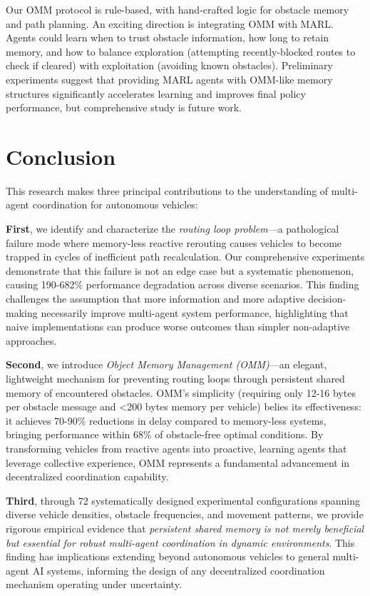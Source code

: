 \documentclass[conference]{IEEEtran}
\begin{document}
Our OMM protocol is rule-based, with hand-crafted logic for obstacle memory and path planning. An exciting direction is integrating OMM with MARL. Agents could learn when to trust obstacle information, how long to retain memory, and how to balance exploration (attempting recently-blocked routes to check if cleared) with exploitation (avoiding known obstacles). Preliminary experiments suggest that providing MARL agents with OMM-like memory structures significantly accelerates learning and improves final policy performance, but comprehensive study is future work.

\section{Conclusion}

This research makes three principal contributions to the understanding of multi-agent coordination for autonomous vehicles:

\textbf{First}, we identify and characterize the \textit{routing loop problem}—a pathological failure mode where memory-less reactive rerouting causes vehicles to become trapped in cycles of inefficient path recalculation. Our comprehensive experiments demonstrate that this failure is not an edge case but a systematic phenomenon, causing 190-682\% performance degradation across diverse scenarios. This finding challenges the assumption that more information and more adaptive decision-making necessarily improve multi-agent system performance, highlighting that naive implementations can produce worse outcomes than simpler non-adaptive approaches.

\textbf{Second}, we introduce \textit{Object Memory Management (OMM)}—an elegant, lightweight mechanism for preventing routing loops through persistent shared memory of encountered obstacles. OMM's simplicity (requiring only 12-16 bytes per obstacle message and <200 bytes memory per vehicle) belies its effectiveness: it achieves 70-90\% reductions in delay compared to memory-less systems, bringing performance within 68\% of obstacle-free optimal conditions. By transforming vehicles from reactive agents into proactive, learning agents that leverage collective experience, OMM represents a fundamental advancement in decentralized coordination capability.

\textbf{Third}, through 72 systematically designed experimental configurations spanning diverse vehicle densities, obstacle frequencies, and movement patterns, we provide rigorous empirical evidence that \textit{persistent shared memory is not merely beneficial but essential for robust multi-agent coordination in dynamic environments}. This finding has implications extending beyond autonomous vehicles to general multi-agent AI systems, informing the design of any decentralized coordination mechanism operating under uncertainty.
\end{document}
